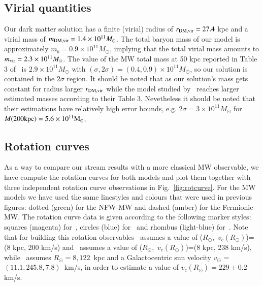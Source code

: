 \documentclass[twocolumn]{aa}
\begin{document}
\subsection{Virial quantities}
Our dark matter solution has a finite (virial) radius of $r_{\rm{DM,vir}}=27.4$ kpc and a virial mass
of $m_{\rm{DM,vir}}=1.4\times10^{11} M_\odot$. The total baryon mass of our model is approximately
$m_b=0.9\times10^{11}M_\odot$, implying that the total virial mass amounts to
$m_{\rm{vir}}=2.3\times10^{11} M_\odot$. The value of the MW total mass at 50 kpc reported in Table 3
of~\citet{2014MNRAS.445.3788G} is $2.9\times10^{11} M_\odot$ with $(\sigma, 2\sigma)=(0.4,0.9)\times10^{11} M_\odot$, so our solution is contained in the $2\sigma$ region.
It should be noted that as our solution's mass gets constant for radius larger
$r_{\rm{DM,vir}}$ while the model studied by~\citet{2014MNRAS.445.3788G} reaches larger estimated
masses according to their Table 3. Nevetheless it should be noted that their estimations have relatively
high error bounds, e.g. $2\sigma=3\times10^{11} M_\odot$ for $M(200\rm{kpc})=5.6\times10^{11} M_\odot$.

\subsection{Rotation curves}
As a way to compare our stream results with a more classical MW observable, we have compute the rotation curves for both models and plot them together with three independent rotation curve observations in
Fig.~\ref{fig:rotcurve}.
For the MW models we have used the same linestyles and colours that were used in previous figures:
dotted (green) for the NFW-MW and dashed (amber) for the Fermionic-MW.
The rotation curve data is given according to the following marker styles: squares (magenta)
for~\citet{sofue_rotation_2013}, circles (blue) for~\citet{Eilers_2019} and rhombus (light-blue)
for~\citet{sofue_2020}. Note that for building this rotation observables~\citet{sofue_rotation_2013}
assumes a value of ($R_\odot$,~$v_c(R_\odot)$)=(8 kpc, 200 km/s) and~\citet{sofue_2020} assumes
a value of ($R_\odot$,~$v_c(R_\odot)$)=(8 kpc, 238 km/s), while~\citet{Eilers_2019}
assumes $R_\odot=8,122$~kpc and a Galactocentric sun velocity $v_\odot$ = $(11.1, 245.8, 7.8)$~km/s,
in order to estimate a value of $v_c(R_\odot)=229\pm0.2$ km/s.
\end{document}
